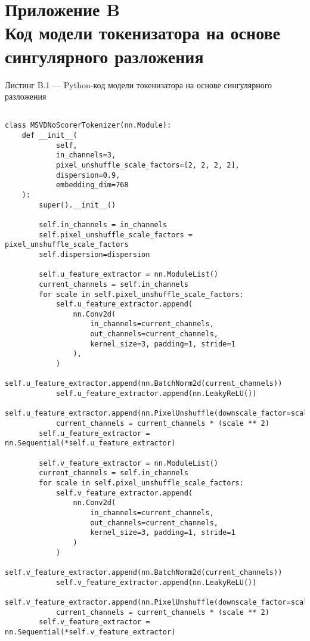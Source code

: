 \appendix
\section*{Приложение B\\Код модели токенизатора на основе сингулярного разложения}

\noindent Листинг B.1 — Python-код модели токенизатора на основе сингулярного разложения
{\scriptsize
\begin{verbatim}

class MSVDNoScorerTokenizer(nn.Module):
    def __init__(
            self,
            in_channels=3,
            pixel_unshuffle_scale_factors=[2, 2, 2, 2],
            dispersion=0.9,
            embedding_dim=768
    ):
        super().__init__()

        self.in_channels = in_channels
        self.pixel_unshuffle_scale_factors = pixel_unshuffle_scale_factors
        self.dispersion=dispersion

        self.u_feature_extractor = nn.ModuleList()
        current_channels = self.in_channels
        for scale in self.pixel_unshuffle_scale_factors:
            self.u_feature_extractor.append(
                nn.Conv2d(
                    in_channels=current_channels,
                    out_channels=current_channels,
                    kernel_size=3, padding=1, stride=1
                ),
            )
            self.u_feature_extractor.append(nn.BatchNorm2d(current_channels))
            self.u_feature_extractor.append(nn.LeakyReLU())
            self.u_feature_extractor.append(nn.PixelUnshuffle(downscale_factor=scale))
            current_channels = current_channels * (scale ** 2)
        self.u_feature_extractor = nn.Sequential(*self.u_feature_extractor)

        self.v_feature_extractor = nn.ModuleList()
        current_channels = self.in_channels
        for scale in self.pixel_unshuffle_scale_factors:
            self.v_feature_extractor.append(
                nn.Conv2d(
                    in_channels=current_channels,
                    out_channels=current_channels,
                    kernel_size=3, padding=1, stride=1
                )
            )
            self.v_feature_extractor.append(nn.BatchNorm2d(current_channels))
            self.v_feature_extractor.append(nn.LeakyReLU())
            self.v_feature_extractor.append(nn.PixelUnshuffle(downscale_factor=scale))
            current_channels = current_channels * (scale ** 2)
        self.v_feature_extractor = nn.Sequential(*self.v_feature_extractor)


\end{verbatim}}
